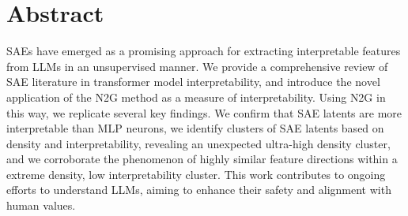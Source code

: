 \section*{Abstract}

\Acp{SAE} have emerged as a promising approach for extracting interpretable features from \acp{LLM} in an unsupervised manner.
We provide a comprehensive review of \ac{SAE} literature in transformer model interpretability, and introduce the novel application of the \ac{N2G} method as a measure of interpretability.
Using \ac{N2G} in this way, we replicate several key findings.
We confirm that \ac{SAE} latents are more interpretable than \ac{MLP} neurons, we identify clusters of \ac{SAE} latents based on density and interpretability, revealing an unexpected ultra-high density cluster, and we corroborate the phenomenon of highly similar feature directions within a extreme density, low interpretability cluster.
This work contributes to ongoing efforts to understand \acp{LLM}, aiming to enhance their safety and alignment with human values.
